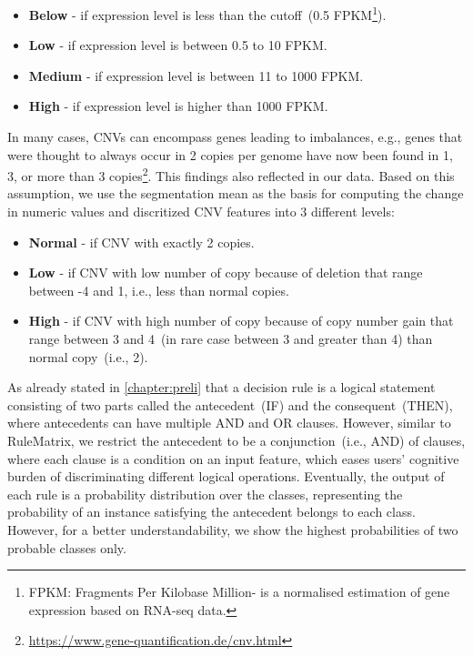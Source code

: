 \vspace{-2mm}
\begin{itemize}[noitemsep]
    \item \textbf{Below} - if expression level is less than the cutoff~(0.5 FPKM\footnote{FPKM: Fragments Per Kilobase Million- is a normalised estimation of gene expression based on RNA-seq data.}).
    \item \textbf{Low} - if expression level is between 0.5 to 10 FPKM.
    \item \textbf{Medium} - if expression level is between 11 to 1000 FPKM. 
    \item \textbf{High} - if expression level is higher than 1000 FPKM. 
\end{itemize}

\hspace*{3.5mm} In many cases, CNVs can encompass genes leading to imbalances, e.g., genes that were thought to always occur in 2 copies per genome have now been found in 1, 3, or more than 3  copies\footnote{\url{https://www.gene-quantification.de/cnv.html}}. This findings also reflected in our data. Based on this assumption, we use the segmentation mean as the basis for computing the change in numeric values and discritized CNV features into 3 different levels:  

\vspace{-2mm}
\begin{itemize}[noitemsep]
    \item \textbf{Normal} - if CNV with exactly 2 copies.
    \item\textbf{Low} - if CNV with low number of copy because of deletion that range between -4 and 1, i.e., less than normal copies.
    \item\textbf{High} - if CNV with high number of copy because of copy number gain that range between 3 and 4~(in rare case between 3 and greater than 4) than normal copy~(i.e., 2).
\end{itemize}
\vspace{-2mm}

\hspace*{3.5mm} As already stated in \cref{chapter:preli} that a decision rule is a logical statement consisting of two parts called the antecedent~(IF) and the consequent~(THEN), where antecedents can have multiple AND and OR clauses. However, similar to RuleMatrix, we restrict the antecedent to be a conjunction~(i.e., AND) of clauses, where each clause is a condition on an input feature, which eases users' cognitive burden of discriminating different logical operations. Eventually, the output of each rule is a probability distribution over the classes, representing the probability of an instance satisfying the antecedent belongs to each class. However, for a better understandability, we show the highest probabilities of two probable classes only. 

